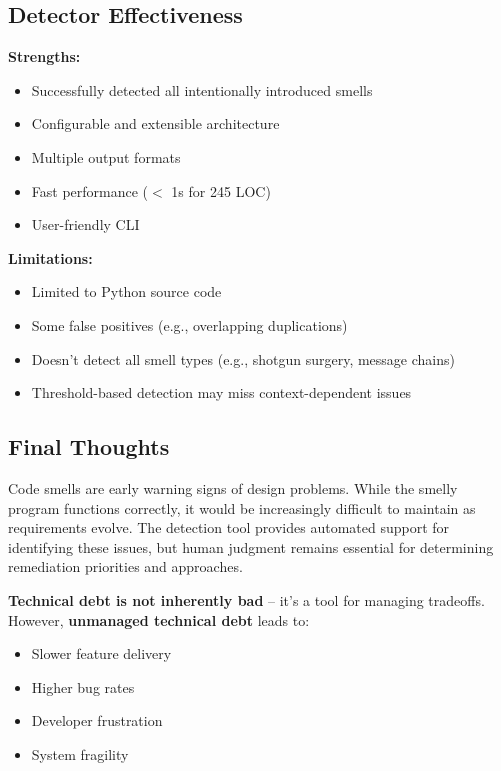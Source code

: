 \documentclass[11pt,a4paper]{article}
\begin{document}
\subsection{Detector Effectiveness}

\textbf{Strengths:}
\begin{itemize}[noitemsep]
    \item Successfully detected all intentionally introduced smells
    \item Configurable and extensible architecture
    \item Multiple output formats
    \item Fast performance ($<$ 1s for 245 LOC)
    \item User-friendly CLI
\end{itemize}

\textbf{Limitations:}
\begin{itemize}[noitemsep]
    \item Limited to Python source code
    \item Some false positives (e.g., overlapping duplications)
    \item Doesn't detect all smell types (e.g., shotgun surgery, message chains)
    \item Threshold-based detection may miss context-dependent issues
\end{itemize}

\subsection{Final Thoughts}

Code smells are early warning signs of design problems. While the smelly program functions correctly, it would be increasingly difficult to maintain as requirements evolve. The detection tool provides automated support for identifying these issues, but human judgment remains essential for determining remediation priorities and approaches.

\textbf{Technical debt is not inherently bad} -- it's a tool for managing tradeoffs. However, \textbf{unmanaged technical debt} leads to:
\begin{itemize}[noitemsep]
    \item Slower feature delivery
    \item Higher bug rates
    \item Developer frustration
    \item System fragility
\end{itemize}
\end{document}
